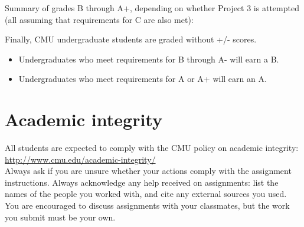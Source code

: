 \documentclass[12pt]{article}
\begin{document}
\bigskip

Summary of grades B through A+, depending on whether Project 3 is attempted\\
(all assuming that requirements for C are also met):
\begin{table}[h!]
\quad
{}
\end{table}

Finally, CMU undergraduate students are graded without +/- scores.
\begin{itemize}
	\item Undergraduates who meet requirements for B through A- will earn a B.
	\item Undergraduates who meet requirements for A or A+ will earn an A.
\end{itemize}

\section*{Academic integrity}
All students are expected to comply with the CMU policy on academic integrity:\\
\url{http://www.cmu.edu/academic-integrity/}\\
Always ask if you are unsure whether your actions comply with the assignment instructions. Always acknowledge any help received on assignments: list the names of the people you worked with, and cite any external sources you used. You are encouraged to discuss assignments with your classmates, but the work you submit must be your own.
\end{document}
